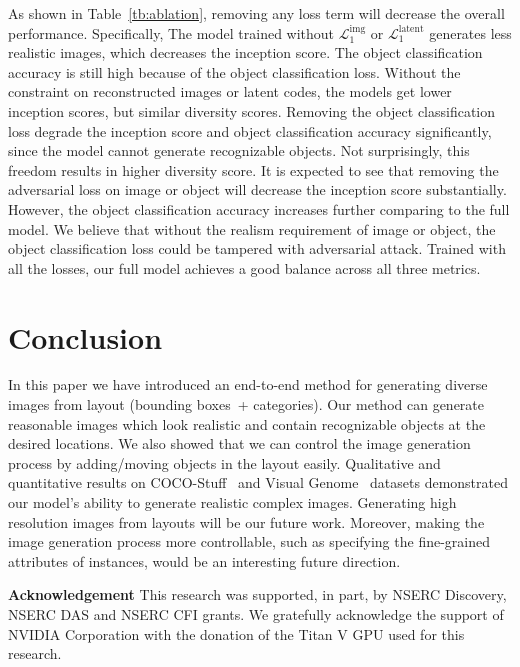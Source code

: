 \documentclass[10pt,twocolumn,letterpaper]{article}
\begin{document}
As shown in Table~\ref{tb:ablation}, removing any loss term will decrease the overall performance.
Specifically, The model trained without $\mathcal{L}_1^\text{img}$ or $\mathcal{L}_1^\text{latent}$ generates less realistic images, which decreases the inception score. The object classification accuracy is still high because of the object classification loss.
Without the constraint on reconstructed images or latent codes, the models get lower inception scores, but similar diversity scores.
Removing the object classification loss degrade the inception score and object classification accuracy significantly, since the model cannot generate recognizable objects. Not surprisingly, this freedom results in higher diversity score.
It is expected to see that removing the adversarial loss on image or object will decrease the inception score substantially. 
However, the object classification accuracy increases further comparing to the full model. We believe that without the realism requirement of image or object, the object classification loss could be tampered with adversarial attack.  
Trained with all the losses, our full model achieves a good balance across all three metrics.


\section{Conclusion}
In this paper we have introduced an end-to-end method for generating diverse images from layout (bounding boxes~+ categories).
Our method can generate reasonable images which look realistic and contain recognizable objects at the desired locations.
We also showed that we can control the image generation process by adding/moving objects in the layout easily.
Qualitative and quantitative results on COCO-Stuff~\cite{caesar2016coco} and Visual Genome~\cite{krishna2017visual} datasets demonstrated our model's ability to generate realistic complex images.
Generating high resolution images from layouts will be our future work. 
Moreover, making the image generation process more controllable, such as specifying the fine-grained attributes of instances, would be an interesting future direction.

\vspace{+0.1in}
\small \noindent \textbf{Acknowledgement}
This research was supported, in part, by NSERC Discovery, NSERC DAS and NSERC CFI grants. 
We gratefully acknowledge the support of NVIDIA Corporation with the donation of the Titan V GPU used for this research.
{\small


}
\end{document}
